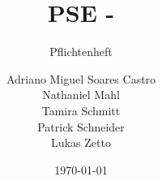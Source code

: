 \title{
    PSE -
}
\subtitle{Pflichtenheft}
\author{
    Adriano Miguel Soares Castro \\
    Nathaniel Mahl \\
    Tamira Schmitt \\
    Patrick Schneider \\
    Lukas Zetto
}

\date{\today}

\maketitle